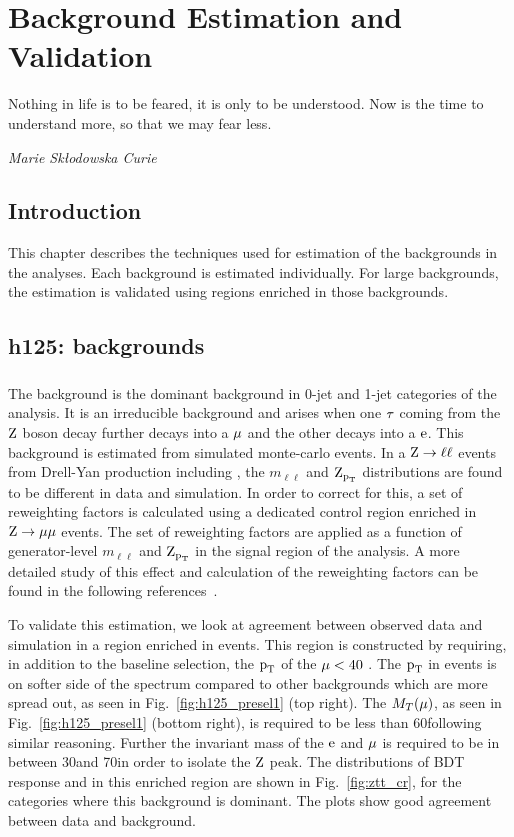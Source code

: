 \chapter{Background Estimation and Validation}
\epigraph{Nothing in life is to be feared, it is only to be understood. Now is the time to understand more, so that we may fear less.}{\textit{Marie Skłodowska Curie}}
\label{bg_val}
\section{Introduction}
This chapter describes the techniques used for estimation of the backgrounds in the analyses. Each background is estimated individually. For large backgrounds, the estimation is validated using regions enriched in those backgrounds.

\section{h125: \hmue backgrounds}
\label{h125_bg_val}

\subsection{\ztt}
\label{h125_ztt}
The \ztt background is the dominant background in 0-jet and 1-jet categories of the analysis. It is an irreducible background and arises when one $\tau$ coming from the $\text{Z}$ boson decay further decays into a $\mu$ and the other decays into a $\text{e}$. This background is estimated from simulated monte-carlo events. In a $\text{Z} \to \ell \ell$ events from Drell-Yan production including \ztt, the $m_{\ell\ell}$ and $\text{Z}_{\text{p}_\text{T}}$ distributions are found to be different in data and simulation. In order to correct for this, a set of reweighting factors is calculated using a dedicated control region enriched in $\text{Z} \to \mu\mu$ events. The set of reweighting factors are applied as a function of generator-level $m_{\ell\ell}$ and $\text{Z}_{\text{p}_\text{T}}$ in the signal region of the analysis. A more detailed study of this effect and calculation of the reweighting factors can be found in the following references~\cite{CMS-PAS-HIG-16-043}.

To validate this estimation, we look at agreement between observed data and simulation in a region enriched in \ztt events. This region is constructed by requiring, in addition to the baseline selection,  the $\text{p}_\text{T}$ of the $\mu<40$ \GeV. The $\text{p}_\text{T}$ in \ztt events is on softer side of the spectrum compared to other backgrounds which are more spread out, as seen in Fig.~\ref{fig:h125_presel1} (top right). The $M_T(\mu)$, as seen in Fig.~\ref{fig:h125_presel1} (bottom right), is required to be less than 60\GeV following similar reasoning. Further the invariant mass of the $\text{e}$ and $\mu$ is required to be in between 30\GeV and 70\GeV in order to isolate the $\text{Z}$ peak. The distributions of BDT response and \mcol in this \ztt enriched region are shown in Fig.~\ref{fig:ztt_cr}, for the categories where this background is dominant. The plots show good agreement between data and background.



